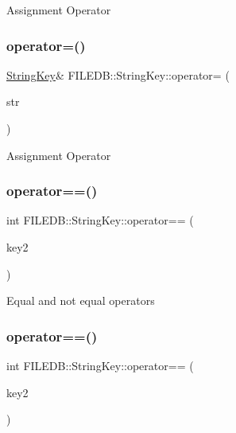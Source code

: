 Assignment Operator \mbox{\label{classFILEDB_1_1StringKey_ad52c218455b3eb934a68f3d13ab6512e}} 
\subsubsection{\texorpdfstring{operator=()}{operator=()}\hspace{0.1cm}{\footnotesize\ttfamily [4/4]}}
{\footnotesize\ttfamily \mbox{\hyperlink{classFILEDB_1_1StringKey}{String\+Key}}\& F\+I\+L\+E\+D\+B\+::\+String\+Key\+::operator= (\begin{DoxyParamCaption}\item[{const std\+::string \&}]{str }\end{DoxyParamCaption})}

Assignment Operator \mbox{\label{classFILEDB_1_1StringKey_a75f2abcdf7d61bb860156f8758a56a1f}} 
\subsubsection{\texorpdfstring{operator==()}{operator==()}\hspace{0.1cm}{\footnotesize\ttfamily [1/2]}}
{\footnotesize\ttfamily int F\+I\+L\+E\+D\+B\+::\+String\+Key\+::operator== (\begin{DoxyParamCaption}\item[{const \mbox{\hyperlink{classFILEDB_1_1StringKey}{String\+Key}} \&}]{key2 }\end{DoxyParamCaption})}

Equal and not equal operators \mbox{\label{classFILEDB_1_1StringKey_a75f2abcdf7d61bb860156f8758a56a1f}} 
\subsubsection{\texorpdfstring{operator==()}{operator==()}\hspace{0.1cm}{\footnotesize\ttfamily [2/2]}}
{\footnotesize\ttfamily int F\+I\+L\+E\+D\+B\+::\+String\+Key\+::operator== (\begin{DoxyParamCaption}\item[{const \mbox{\hyperlink{classFILEDB_1_1StringKey}{String\+Key}} \&}]{key2 }\end{DoxyParamCaption})}

